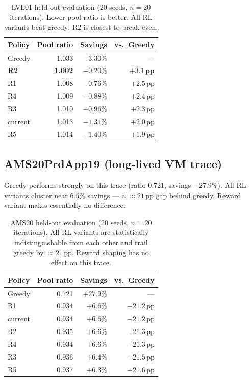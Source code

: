 \documentclass[11pt]{article}
\begin{document}
\begin{table}[H]
\centering
\begin{tabular}{lrrr}
\toprule
\textbf{Policy} & \textbf{Pool ratio} & \textbf{Savings} & \textbf{vs.\ Greedy} \\
\midrule
Greedy          & 1.033 & $-3.30\%$ & --- \\
\textbf{R2}     & \textbf{1.002} & $\mathbf{-0.20\%}$ & $\mathbf{+3.1\,\text{pp}}$ \\
R1              & 1.008 & $-0.76\%$ & $+2.5\,\text{pp}$ \\
R4              & 1.009 & $-0.88\%$ & $+2.4\,\text{pp}$ \\
R3              & 1.010 & $-0.96\%$ & $+2.3\,\text{pp}$ \\
current         & 1.013 & $-1.31\%$ & $+2.0\,\text{pp}$ \\
R5              & 1.014 & $-1.40\%$ & $+1.9\,\text{pp}$ \\
\bottomrule
\end{tabular}
\caption{LVL01 held-out evaluation (20 seeds, $n=20$ iterations).
  Lower pool ratio is better. All RL variants beat greedy; R2 is closest to break-even.}
\label{tab:lvl01}
\end{table}

\subsection{AMS20PrdApp19 (long-lived VM trace)}

Greedy performs strongly on this trace (ratio $0.721$, savings $+27.9\%$).
All RL variants cluster near $6.5\%$ savings — a $\approx21\,\text{pp}$ gap behind greedy.
Reward variant makes essentially no difference.

\begin{table}[H]
\centering
\begin{tabular}{lrrr}
\toprule
\textbf{Policy} & \textbf{Pool ratio} & \textbf{Savings} & \textbf{vs.\ Greedy} \\
\midrule
Greedy          & 0.721 & $+27.9\%$ & --- \\
R1              & 0.934 & $+6.6\%$  & $-21.2\,\text{pp}$ \\
current         & 0.934 & $+6.6\%$  & $-21.2\,\text{pp}$ \\
R2              & 0.935 & $+6.6\%$  & $-21.3\,\text{pp}$ \\
R4              & 0.934 & $+6.6\%$  & $-21.3\,\text{pp}$ \\
R3              & 0.936 & $+6.4\%$  & $-21.5\,\text{pp}$ \\
R5              & 0.937 & $+6.3\%$  & $-21.6\,\text{pp}$ \\
\bottomrule
\end{tabular}
\caption{AMS20 held-out evaluation (20 seeds, $n=20$ iterations).
  All RL variants are statistically indistinguishable from each other
  and trail greedy by $\approx21\,\text{pp}$. Reward shaping has no effect on this trace.}
\label{tab:ams20}
\end{table}
\end{document}
